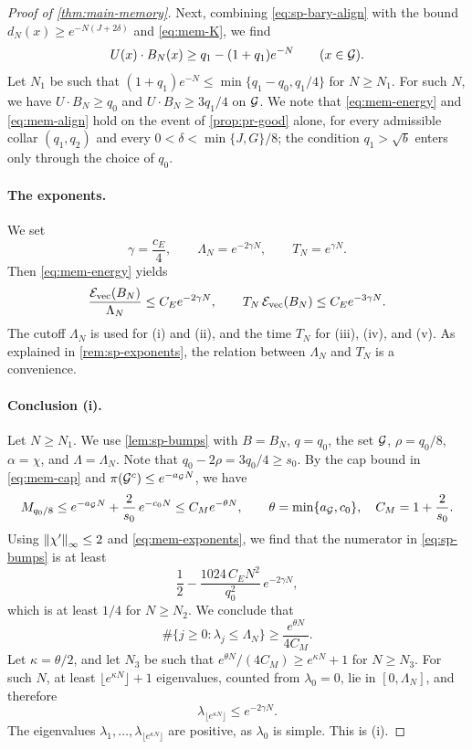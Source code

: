 \begin{proof}[Proof of \cref{thm:main-memory}]
Next, combining \eqref{eq:sp-bary-align} with the bound $d_N(x)\ge e^{-N(J+2\delta)}$ and \eqref{eq:mem-K}, we find
\begin{equation}\label{eq:mem-align}
U(x)\cdot B_N(x)\ge q_1-(1+q_1)e^{-N}\qquad(x\in\mathcal G).
\end{equation}
Let $N_1$ be such that $(1+q_1)e^{-N}\le\min\{q_1-q_0,q_1/4\}$ for $N\ge N_1$. For such $N$, we have $U\cdot B_N\ge q_0$ and $U\cdot B_N\ge3q_1/4$ on $\mathcal G$. We note that \eqref{eq:mem-energy} and \eqref{eq:mem-align} hold on the event of \cref{prop:pr-good} alone, for every admissible collar $(q_1,q_2)$ and every $0<\delta<\min\{J,G\}/8$; the condition $q_1>\sqrt b$ enters only through the choice of $q_0$.

\paragraph{The exponents.} We set
\[
\gamma=\frac{c_E}4,\qquad \Lambda_N=e^{-2\gamma N},\qquad T_N=e^{\gamma N}.
\]
Then \eqref{eq:mem-energy} yields
\begin{equation}\label{eq:mem-exponents}
\frac{\mathcal E_{\rm vec}(B_N)}{\Lambda_N}\le C_Ee^{-2\gamma N},
\qquad
T_N\,\mathcal E_{\rm vec}(B_N)\le C_Ee^{-3\gamma N}.
\end{equation}
The cutoff $\Lambda_N$ is used for (i) and (ii), and the time $T_N$ for (iii), (iv), and (v). As explained in \cref{rem:sp-exponents}, the relation between $\Lambda_N$ and $T_N$ is a convenience.

\paragraph{Conclusion (i).} Let $N\ge N_1$. We use \cref{lem:sp-bumps} with $B=B_N$, $q=q_0$, the set $\mathcal G$, $\rho=q_0/8$, $\alpha=\chi$, and $\Lambda=\Lambda_N$. Note that $q_0-2\rho=3q_0/4\ge s_0$. By the cap bound in \eqref{eq:mem-cap} and $\pi(\mathcal G^c)\le e^{-a_\mathcal G N}$, we have
\[
M_{q_0/8}\le e^{-a_\mathcal G N}+\frac2{s_0}\,e^{-c_0N}\le C_Me^{-\theta N},
\qquad
\theta=\min\{a_\mathcal G,c_0\},\quad C_M=1+\frac2{s_0}.
\]
Using $\left\lVert\chi'\right\rVert_\infty\le2$ and \eqref{eq:mem-exponents}, we find that the numerator in \eqref{eq:sp-bumps} is at least
\[
\frac12-\frac{1024\,C_EN^2}{q_0^2}\,e^{-2\gamma N},
\]
which is at least $1/4$ for $N\ge N_2$. We conclude that
\[
\#\{j\ge0:\lambda_j\le\Lambda_N\}\ge\frac{e^{\theta N}}{4C_M}.
\]
Let $\kappa=\theta/2$, and let $N_3$ be such that $e^{\theta N}/(4C_M)\ge e^{\kappa N}+1$ for $N\ge N_3$. For such $N$, at least $\lfloor e^{\kappa N}\rfloor+1$ eigenvalues, counted from $\lambda_0=0$, lie in $[0,\Lambda_N]$, and therefore
\[
\lambda_{\lfloor e^{\kappa N}\rfloor}\le e^{-2\gamma N}.
\]
The eigenvalues $\lambda_1,\dots,\lambda_{\lfloor e^{\kappa N}\rfloor}$ are positive, as $\lambda_0$ is simple. This is (i).


\end{proof}
